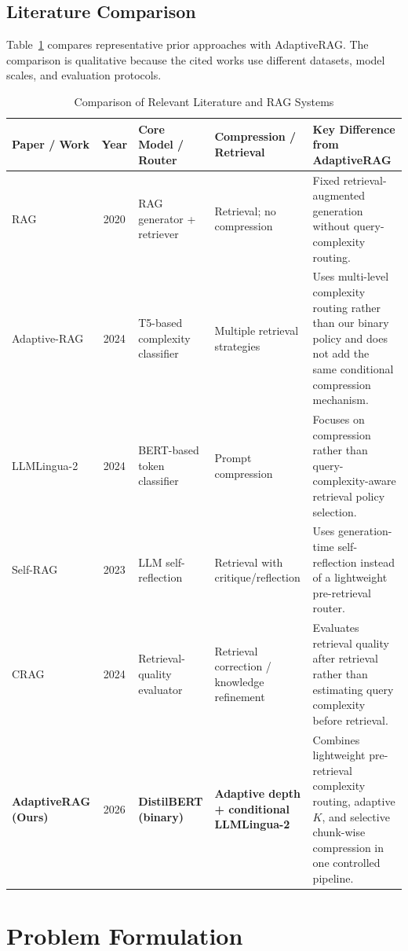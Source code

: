 \documentclass[conference]{IEEEtran}
\begin{document}
\subsection{Literature Comparison}

Table~\ref{tab:lit_comp} compares representative prior approaches with AdaptiveRAG. The comparison is qualitative because the cited works use different datasets, model scales, and evaluation protocols.

\begin{table}[t]
\centering
\small
\caption{Comparison of Relevant Literature and RAG Systems}
\label{tab:lit_comp}
\begin{tabular}{p{2.25cm}cp{3.1cm}p{3.1cm}p{5.5cm}}
\toprule
\textbf{Paper / Work} & \textbf{Year} & \textbf{Core Model / Router} & \textbf{Compression / Retrieval} & \textbf{Key Difference from AdaptiveRAG} \\
\midrule
RAG \cite{lewis2020rag} & 2020 & RAG generator + retriever & Retrieval; no compression & Fixed retrieval-augmented generation without query-complexity routing. \\
Adaptive-RAG \cite{jeong2024adaptiverag} & 2024 & T5-based complexity classifier & Multiple retrieval strategies & Uses multi-level complexity routing rather than our binary policy and does not add the same conditional compression mechanism. \\
LLMLingua-2 \cite{pan2024llmlingua2} & 2024 & BERT-based token classifier & Prompt compression & Focuses on compression rather than query-complexity-aware retrieval policy selection. \\
Self-RAG \cite{asai2024selfrag} & 2023 & LLM self-reflection & Retrieval with critique/reflection & Uses generation-time self-reflection instead of a lightweight pre-retrieval router. \\
CRAG \cite{yan2024crag} & 2024 & Retrieval-quality evaluator & Retrieval correction / knowledge refinement & Evaluates retrieval quality after retrieval rather than estimating query complexity before retrieval. \\
\textbf{AdaptiveRAG (Ours)} & 2026 & \textbf{DistilBERT (binary)} & \textbf{Adaptive depth + conditional LLMLingua-2} & Combines lightweight pre-retrieval complexity routing, adaptive $K$, and selective chunk-wise compression in one controlled pipeline. \\
\bottomrule
\end{tabular}
\end{table}

\section{Problem Formulation}
\end{document}
